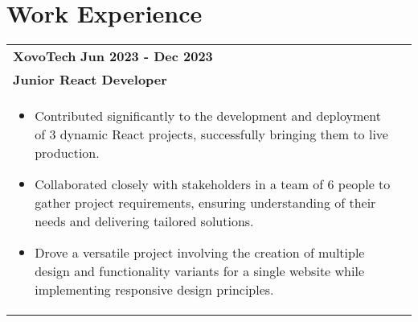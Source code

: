 \documentclass[a4paper,8pt]{article}
\begin{document}
\section{\textbf{Work Experience}}
\begin{tabularx}{\linewidth}{ @{}l r@{} }
\textbf{XovoTech} \hfill \textbf{Jun 2023 - Dec 2023} \\[4pt]
\textbf{Junior React Developer}\\[4pt]
\begin{minipage}[t]{\linewidth}
    \begin{itemize}[nosep,after=\strut, leftmargin=1em, itemsep=2pt]
        \item Contributed significantly to the development and deployment of 3 dynamic React projects, successfully bringing them to live production.
        \item Collaborated closely with stakeholders in a team of 6 people to gather project requirements, ensuring understanding of their needs and delivering tailored solutions.
        \item Drove a versatile project involving the creation of multiple design and functionality variants for a single website while implementing responsive design principles.
    \end{itemize}
\end{minipage}
\end{tabularx}

\end{document}
